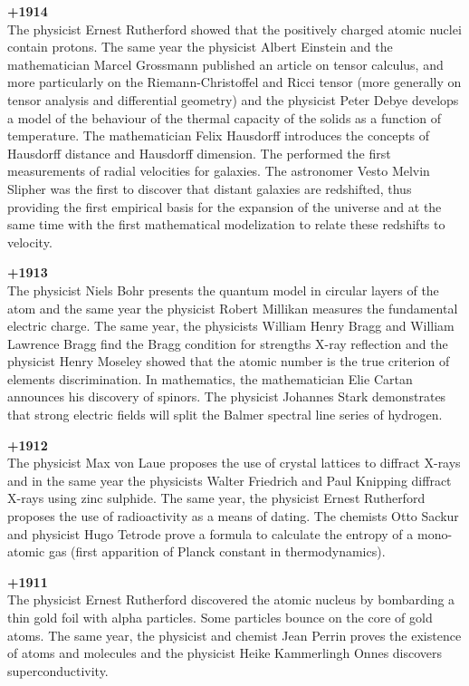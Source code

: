 \textbf{+1914}\\
The physicist Ernest Rutherford showed that the positively charged atomic nuclei contain protons. The same year the physicist Albert Einstein and the mathematician Marcel Grossmann published an article on tensor calculus, and more particularly on the Riemann-Christoffel and Ricci tensor (more generally on tensor analysis and differential geometry) and the physicist Peter Debye develops a model of the behaviour of the thermal capacity of the solids as a function of temperature. The mathematician Felix Hausdorff introduces the concepts of Hausdorff distance and Hausdorff dimension. The performed the first measurements of radial velocities for galaxies. The astronomer Vesto Melvin Slipher was the first to discover that distant galaxies are redshifted, thus providing the first empirical basis for the expansion of the universe and at the same time with the first mathematical modelization to relate these redshifts to velocity.

\textbf{+1913}\\
The physicist Niels Bohr presents the quantum model in circular layers of the atom and the same year the physicist Robert Millikan measures the fundamental electric charge. The same year, the physicists William Henry Bragg and William Lawrence Bragg find the Bragg condition for strengths X-ray reflection and the physicist Henry Moseley showed that the atomic number is the true criterion of elements discrimination. In mathematics, the mathematician Elie Cartan announces his discovery of spinors. The physicist Johannes Stark demonstrates that strong electric fields will split the Balmer spectral line series of hydrogen.

\textbf{+1912}\\
The physicist Max von Laue proposes the use of crystal lattices to diffract X-rays and in the same year the physicists Walter Friedrich and Paul Knipping diffract X-rays using zinc sulphide. The same year, the physicist Ernest Rutherford proposes the use of radioactivity as a means of dating. The chemists Otto Sackur and physicist Hugo Tetrode prove a formula to calculate the entropy of a mono-atomic gas (first apparition of Planck constant in thermodynamics).

\textbf{+1911}\\
The physicist Ernest Rutherford discovered the atomic nucleus by bombarding a thin gold foil with alpha particles. Some particles bounce on the core of gold atoms. The same year, the physicist and chemist Jean Perrin proves the existence of atoms and molecules and the physicist Heike Kammerlingh Onnes discovers superconductivity.

